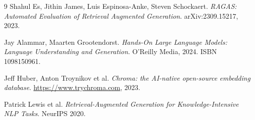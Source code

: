 \documentclass[11pt,a4paper]{article}
\begin{document}
\begin{thebibliography}{9}
    Shahul Es, Jithin James, Luis Espinosa-Anke, Steven Schockaert.
    \textit{RAGAS: Automated Evaluation of Retrieval Augmented Generation}.
    arXiv:2309.15217, 2023.

    Jay Alammar, Maarten Grootendorst.
    \textit{Hands-On Large Language Models: Language Understanding and Generation}.
    O'Reilly Media, 2024. ISBN 1098150961.

    Jeff Huber, Anton Troynikov et al.
    \textit{Chroma: the AI-native open-source embedding database}.
    \url{https://www.trychroma.com}, 2023.

    Patrick Lewis et al.
    \textit{Retrieval-Augmented Generation for Knowledge-Intensive NLP Tasks}.
    NeurIPS 2020.
\end{thebibliography}
\end{document}
